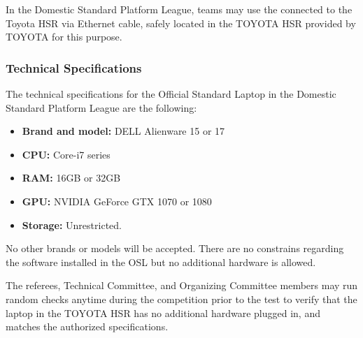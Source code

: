 
%
%
In the Domestic Standard Platform League, teams may use the  connected to the Toyota HSR via Ethernet cable, safely located in the TOYOTA HSR  provided by TOYOTA for this purpose.

\subsubsection{Technical Specifications}
The technical specifications for the Official Standard Laptop in the Domestic Standard Platform League are the following:


 \begin{itemize}
  \item \textbf{Brand and model:} DELL Alienware 15 or 17
  \item \textbf{CPU:} Core-i7 series
  \item \textbf{RAM:} 16GB or 32GB
  \item \textbf{GPU:} NVIDIA GeForce GTX 1070 or 1080
  \item \textbf{Storage:} Unrestricted.
\end{itemize}

No other brands or models will be accepted. There are no constrains regarding the software installed in the OSL but no additional hardware is allowed.

The referees, Technical Committee, and Organizing Committee members may run random checks anytime during the competition prior to the test to verify that the laptop in the TOYOTA HSR  has no additional hardware plugged in, and matches the authorized specifications.

